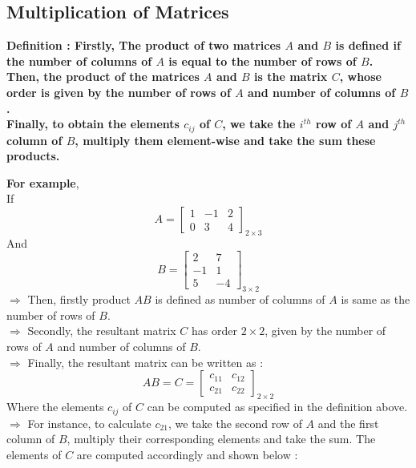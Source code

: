 \documentclass[12pt, letterpaper]{article}
\begin{document}
\subsection{Multiplication of Matrices}
\begin{displayquote}
\textbf{Definition : Firstly, The product of two matrices $A$ and $B$ is defined if the number of columns of $A$ is equal to the number of rows of $B$.\\ 
Then, the product of the matrices $A$ and $B$ is the matrix $C$, whose order is given by the number of rows of $A$ and number of columns of $B$.\\
Finally, to obtain the elements $c_{ij}$ of $C$, we take the $i^{th}$ row of $A$ and $j^{th}$ column of $B$, multiply them element-wise and take the sum these products.}  
\end{displayquote}
\textbf{For example},\\
If
\begin{displaymath}
 A = \begin{bmatrix}
1 & -1 & 2\\
0 & 3 & 4
\end{bmatrix}_{2 \times 3}
\end{displaymath} 
And 
\begin{displaymath}
B = \begin{bmatrix}
2 & 7\\
-1 & 1\\
5 & -4
\end{bmatrix}_{3 \times 2}
\end{displaymath}
$\Rightarrow$ Then, firstly product $AB$ is defined as number of columns of $A$ is same as the number of rows of $B$.\\
$\Rightarrow$ Secondly, the resultant matrix $C$ has order $2 \times 2$, given by the number of rows of $A$ and number of columns of $B$.\\
$\Rightarrow$ Finally, the resultant matrix can be written as : 
\begin{displaymath}
AB = C = \begin{bmatrix}
c_{11} & c_{12}\\
c_{21} & c_{22}
\end{bmatrix}_{2 \times 2}
\end{displaymath}
Where the elements $c_{ij}$ of $C$ can be computed as specified in the definition above.\\
$\Rightarrow$ For instance, to calculate $c_{21}$, we take the second row of $A$ and the first column of $B$, multiply their corresponding elements and take the sum. The elements of $C$ are computed accordingly and shown below :  
\end{document}
